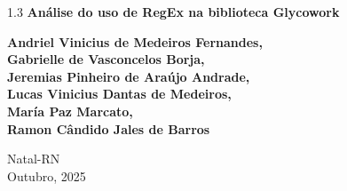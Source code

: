 \begin{titlepage}
\begin{center}
		\vspace{6cm}
						
		{\setlength{\baselineskip}%
		{1.3\baselineskip}
		{\LARGE \textbf{Análise do uso de RegEx na biblioteca Glycowork}}\par}
			
		\vspace{2cm}
			
		{\large \textbf{Andriel Vinicius de Medeiros Fernandes, \\
		Gabrielle de Vasconcelos Borja, \\
		Jeremias Pinheiro de Araújo Andrade, \\
		Lucas Vinicius Dantas de Medeiros, \\
		María Paz Marcato, \\
		Ramon Cândido Jales de Barros \\}}
		\vspace{5cm}
	
		Natal-RN\\Outubro, 2025 
	\end{center}
\end{titlepage}